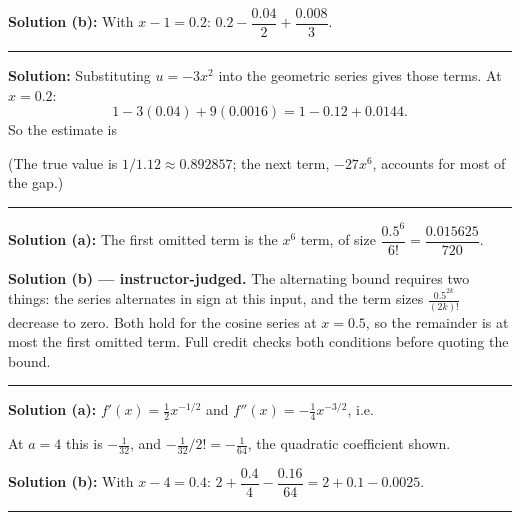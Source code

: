 \documentclass[12pt]{article}
\begin{document}
\textbf{Solution (b):} With $x - 1 = 0.2$: \; $0.2 - \dfrac{0.04}{2} + \dfrac{0.008}{3}$. 

\vspace{0.2cm}\noindent\rule{\linewidth}{0.2pt}\vspace{0.2cm}


\textbf{Solution:} Substituting $u = -3x^{2}$ into the geometric series gives those terms. At $x = 0.2$:
\[ 1 - 3(0.04) + 9(0.0016) = 1 - 0.12 + 0.0144. \]
So the estimate is 

(The true value is $1/1.12 \approx 0.892857$; the next term, $-27x^{6}$, accounts for most of the gap.)

\vspace{0.2cm}\noindent\rule{\linewidth}{0.2pt}\vspace{0.2cm}


\textbf{Solution (a):} The first omitted term is the $x^{6}$ term, of size $\dfrac{0.5^{6}}{6!} = \dfrac{0.015625}{720}$. 

\textbf{Solution (b) --- instructor-judged.} The alternating bound requires two things: the series alternates in sign at this input, and the term sizes $\frac{0.5^{2k}}{(2k)!}$ decrease to zero. Both hold for the cosine series at $x = 0.5$, so the remainder is at most the first omitted term. Full credit checks both conditions before quoting the bound.

\vspace{0.2cm}\noindent\rule{\linewidth}{0.2pt}\vspace{0.2cm}


\textbf{Solution (a):} $f'(x) = \frac12 x^{-1/2}$ and $f''(x) = -\frac14 x^{-3/2}$, i.e. 

At $a = 4$ this is $-\frac{1}{32}$, and $-\frac{1}{32}/2! = -\frac{1}{64}$, the quadratic coefficient shown.

\textbf{Solution (b):} With $x - 4 = 0.4$: \; $2 + \dfrac{0.4}{4} - \dfrac{0.16}{64} = 2 + 0.1 - 0.0025$. 

\vspace{0.2cm}\noindent\rule{\linewidth}{0.2pt}\vspace{0.2cm}
\end{document}
